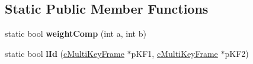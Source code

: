 \subsection*{Static Public Member Functions}
\begin{DoxyCompactItemize}
\item 
static bool {\bfseries weight\+Comp} (int a, int b)\hypertarget{classMultiColSLAM_1_1cMultiKeyFrame_aaeb50e33e2817180ad5217bdbb75f583}{}\label{classMultiColSLAM_1_1cMultiKeyFrame_aaeb50e33e2817180ad5217bdbb75f583}

\item 
static bool {\bfseries l\+Id} (\hyperlink{classMultiColSLAM_1_1cMultiKeyFrame}{c\+Multi\+Key\+Frame} $\ast$p\+K\+F1, \hyperlink{classMultiColSLAM_1_1cMultiKeyFrame}{c\+Multi\+Key\+Frame} $\ast$p\+K\+F2)\hypertarget{classMultiColSLAM_1_1cMultiKeyFrame_a8ff8909f990679cee4dab6126a1ba5e8}{}\label{classMultiColSLAM_1_1cMultiKeyFrame_a8ff8909f990679cee4dab6126a1ba5e8}

\end{DoxyCompactItemize}
